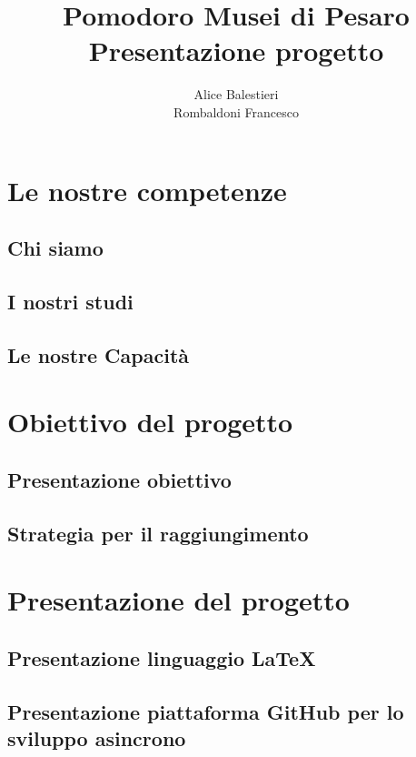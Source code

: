 \documentclass[hidelinks,12pt,a4paper]{article}
\begin{document}
	\begin{flushleft}
		
		\title{\textbf{Pomodoro Musei di Pesaro}\\\small{Presentazione progetto}}
		\author{Alice Balestieri\\ Rombaldoni Francesco}
		\date{}
		
		\maketitle
		
		\setcounter{page}{1}
		\newpage
		\tableofcontents
		\newpage
		
		\section{Le nostre competenze}
			\subsection{Chi siamo}
			\subsection{I nostri studi}
			\subsection{Le nostre Capacità}
		
		\section{Obiettivo del progetto}
			\subsection{Presentazione obiettivo}
			\subsection{Strategia per il raggiungimento}
		
		\section{Presentazione del progetto}
			\subsection{Presentazione linguaggio \LaTeX}
			\subsection{Presentazione piattaforma GitHub per lo sviluppo asincrono}

\end{flushleft}
\end{document}
